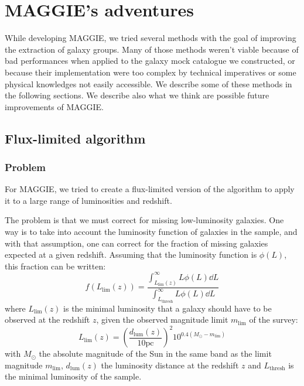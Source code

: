 \chapter[MAGGIE's adventures]{MAGGIE's adventures}
\label{cha:MAGGIE_adventures}

While developing MAGGIE, we tried several methods with the goal of improving
the extraction of galaxy groups. Many of those methods weren't viable because
of bad performances when applied to the galaxy mock catalogue we constructed,
or because their implementation were too complex by technical imperatives or
some physical knowledges not easily accessible. We describe some of these
methods in the following sections. We describe also what we think are possible
future improvements of MAGGIE\@.

\section{Flux-limited algorithm}

\subsection{Problem}

For MAGGIE, we tried to create a flux-limited version of the algorithm to apply
it to a large range of luminosities and redshift.

The problem is that we must correct for missing low-luminosity galaxies. One
way is to take into account the luminosity function of galaxies in the sample,
and with that assumption, one can correct for the fraction of missing galaxies
expected at a given redshift. Assuming that the luminosity function is
$\phi\left(L\right)$, this fraction can be written:
%
\begin{equation}\label{eq:correc}
    f\left(L_{\lim}\left(z\right)\right)=
    \frac{\int_{L_{\lim}\left(z\right)}^\infty L\phi\left(L\right)\dd L}
    {\int_{L_\mathrm{thresh}}^\infty L\phi\left(L\right)\dd L}
\end{equation}
%
where $L_{\lim}\left(z\right)$ is the minimal luminosity that a galaxy should
have to be observed at the redshift $z$, given the observed magnitude limit
$m_{\lim}$ of the survey:
%
\begin{equation}
    L_{\lim}\left(z\right)=
    {\left(\frac{d_\mathrm{lum}\left(z\right)}{10\mathrm{pc}}\right)}^2
    10^{0.4\left(M_{\odot}-m_{\lim}\right)}
\end{equation}
%
with $M_\odot$ the absolute magnitude of the Sun in the same band as the limit
magnitude $m_{\lim}$, $d_\mathrm{lum} \left(z\right)$ the luminosity distance
at the redshift $z$ and $L_\mathrm{thresh}$ is the minimal luminosity of the
sample.

